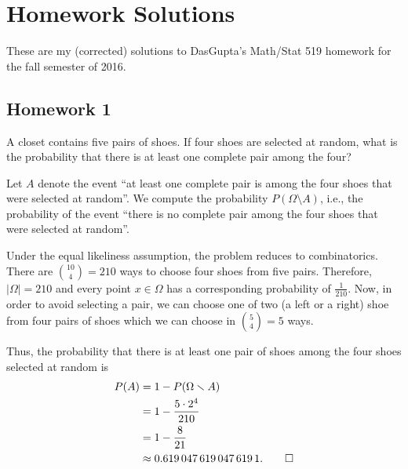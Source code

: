 \section{Homework Solutions}
These are my (corrected) solutions to DasGupta's Math/Stat 519 homework for
the fall semester of 2016.
\subsection{Homework 1}
\begin{problem}[Handout 1, \# 5]
  A closet contains five pairs of shoes. If four shoes are selected at
  random, what is the probability that there is at least one complete pair
  among the four?
\end{problem}
\begin{solution*}
  Let \(A\) denote the event ``at least one complete pair is among the four
  shoes that were selected at random''. We compute the probability
  \(P(\Omega\setminus A)\), i.e., the probability of the event ``there is
  no complete pair among the four shoes that were selected at random''.

  Under the equal likeliness assumption, the problem reduces to
  combinatorics. There are \(\binom{10}{4}=210\) ways to choose four shoes
  from five pairs. Therefore, \(|\Omega|=210\) and every point
  \(x\in\Omega\) has a corresponding probability of \(\frac{1}{210}\). Now,
  in order to avoid selecting a pair, we can choose one of two (a left or a
  right) shoe from four pairs of shoes which we can choose in
  \(\binom{5}{4}=5\) ways.

  Thus, the probability that there is at least one pair of shoes among the
  four shoes selected at random is
  \begin{align*}
    P(A)
    &=1-P(\Omega\smallsetminus A)\\
    &=1-\frac{5\cdot 2^4}{210}\\
    &=1-\frac{8}{21}\\
    &\approx\num{0.6190476190476191}.\qedhere
  \end{align*}
\end{solution*}

